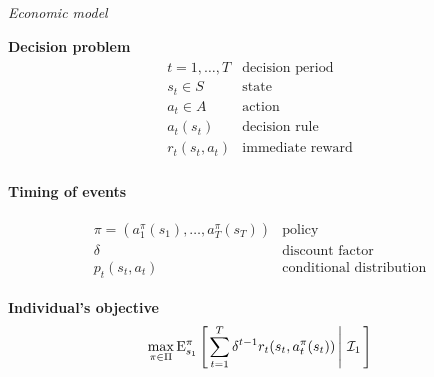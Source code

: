 \begin{frame}\begin{center}
		\LARGE\textit{Economic model}
\end{center}\end{frame}
\begin{frame}
\textbf{Decision problem}
\begin{align*}\begin{array}{ll}
t = 1, \hdots, T& \text{decision period} \\
s_t\in S & \text{state}  \\
a_t\in A & \text{action} \\
a_t(s_t) & \text{decision rule} \\
r_t(s_t, a_t) & \text{immediate reward}\\
\end{array}\end{align*}
\end{frame}
\begin{frame}
\begin{center}\textbf{Timing of events}\vspace{0.9cm}
\scalebox{0.9}{\hspace{-0.2cm}}
\end{center}
\end{frame}
\begin{frame}
\begin{align*}\begin{array}{ll}
\pi = (a^\pi_1(s_1), \hdots, a^\pi_T(s_T)) & \text{policy}\\
\delta & \text{discount factor} \\
p_t(s_t, a_t) & \text{conditional distribution}
\end{array}\end{align*}
\end{frame}
\begin{frame}
\textbf{Individual's objective}\vspace{0.3cm}
\begin{align*}
\max_{\pi \in\Pi} \mathrm{E}_{s_1}^\pi\left[\left.\sum^{T}_{t = 1}  \delta^{t - 1} r_t(s_t, a^\pi_t(s_t))\,\right\vert\,\mathcal{I}_1\,\right]
\end{align*}
\end{frame}
